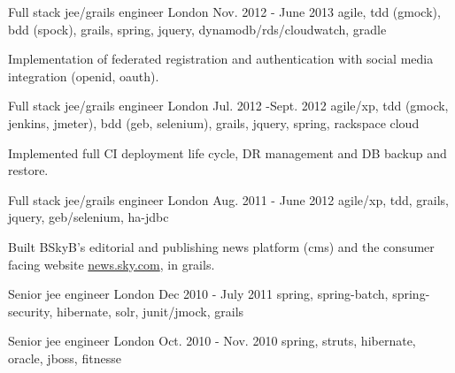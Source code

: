 \begin{cventries}
  \cventry
    {Full stack jee/grails engineer} %
    {} %
    {London} %
    {Nov. 2012 - June 2013} %
    {agile, tdd (gmock), bdd (spock), grails, spring, jquery, dynamodb/rds/cloudwatch, gradle} %
    {
      \begin{cvitems} %
        \item {Implementation of federated registration and authentication with social media integration (openid, oauth).}
      \end{cvitems}
    }

  \cventry
    {Full stack jee/grails engineer} %
    {} %
    {London} %
    {Jul. 2012 -Sept. 2012} %
    {agile/xp, tdd (gmock, jenkins, jmeter), bdd (geb, selenium), grails, jquery, spring, rackspace cloud} %
    {
      \begin{cvitems} %
        \item {Implemented full CI deployment life cycle, DR management and DB backup and restore.}
      \end{cvitems}
    }

  \cventry
    {Full stack jee/grails engineer} %
    {} %
    {London} %
    {Aug. 2011 - June 2012} %
    {agile/xp, tdd, grails, jquery, geb/selenium, ha-jdbc} %
    {
      \begin{cvitems} %
        \item {Built BSkyB's editorial and publishing news platform (cms) and the consumer facing website \url{news.sky.com}, in grails.}
      \end{cvitems}
    }

  \cventry
    {Senior jee engineer} %
    {} %
    {London} %
    {Dec 2010 - July 2011} %
    {spring, spring-batch, spring-security, hibernate, solr, junit/jmock, grails} %
    {}

  \cventry
    {Senior jee engineer} %
    {} %
    {London} %
    {Oct. 2010 - Nov. 2010} %
    {spring, struts, hibernate, oracle, jboss, fitnesse} %
    {}
\end{cventries}

